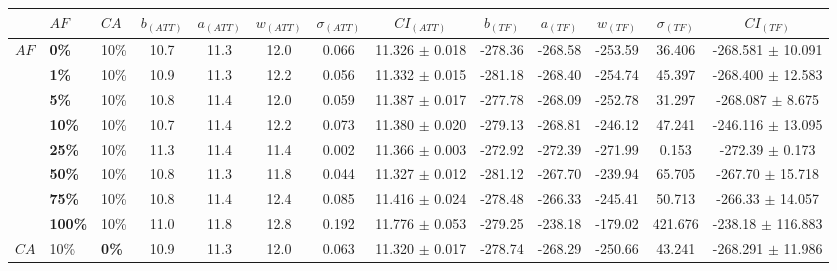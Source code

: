 \begin{sidewaystable}
    \hspace*{-0.7cm}
    \begin{tabular}{|l|l|l||c|c|c|c|c|c|c|c|c|c|}
    \hline
    ~ & $AF$ & $CA$ & $b_{(ATT)}$ & $a_{(ATT)}$ & $w_{(ATT)}$ & $\sigma_{(ATT)}$ & $CI_{(ATT)}$ & $b_{(TF)}$ & $a_{(TF)}$ & $w_{(TF)}$ & $\sigma_{(TF)}$ & $CI_{(TF)}$\\
    \hline
    $AF$ & \textbf{0\%} & 10\% & 10.7 & 11.3 & 12.0 & 0.066 & 11.326 $\pm$ 0.018 & -278.36 & -268.58 & -253.59 & 36.406 & -268.581 $\pm$ 10.091 \\
    ~ & \textbf{1\%} & 10\% & 10.9 & 11.3 & 12.2 & 0.056 & 11.332 $\pm$ 0.015 & -281.18 & -268.40 & -254.74 & 45.397 & -268.400 $\pm$ 12.583 \\
    ~ & \textbf{5\%} & 10\% & 10.8 & 11.4 & 12.0 & 0.059 & 11.387 $\pm$ 0.017 & -277.78 & -268.09 & -252.78 & 31.297 & -268.087 $\pm$ 8.675 \\ 
    ~ & \textbf{10\%} & 10\% & 10.7 & 11.4 & 12.2 & 0.073 & 11.380 $\pm$ 0.020 & -279.13 & -268.81 & -246.12 & 47.241 & -246.116 $\pm$ 13.095 \\ 
    ~ & \textbf{25\%} & 10\% & 11.3 & 11.4 & 11.4 & 0.002 & 11.366 $\pm$ 0.003 & -272.92 & -272.39 & -271.99 & 0.153 & -272.39 $\pm$ 0.173 \\ 
    ~ & \textbf{50\%} & 10\% & 10.8 & 11.3 & 11.8 & 0.044 & 11.327 $\pm$ 0.012 & -281.12 & -267.70 & -239.94 & 65.705 & -267.70 $\pm$ 15.718 \\ 
    ~ & \textbf{75\%} & 10\% & 10.8 & 11.4 & 12.4 & 0.085 & 11.416 $\pm$ 0.024 & -278.48 & -266.33 & -245.41 & 50.713 & -266.33 $\pm$ 14.057 \\ 
    ~ & \textbf{100\%} & 10\% & 11.0 & 11.8 & 12.8 & 0.192 & 11.776 $\pm$ 0.053 & -279.25 & -238.18 & -179.02 & 421.676 & -238.18 $\pm$ 116.883 \\ 
    \hline
    $CA$ & 10\% &\textbf{0\%} & 10.9 & 11.3 & 12.0 & 0.063 & 11.320 $\pm$ 0.017 & -278.74 & -268.29 & -250.66 & 43.241 & -268.291 $\pm$ 11.986 \\


\end{tabular}
\end{sidewaystable}
